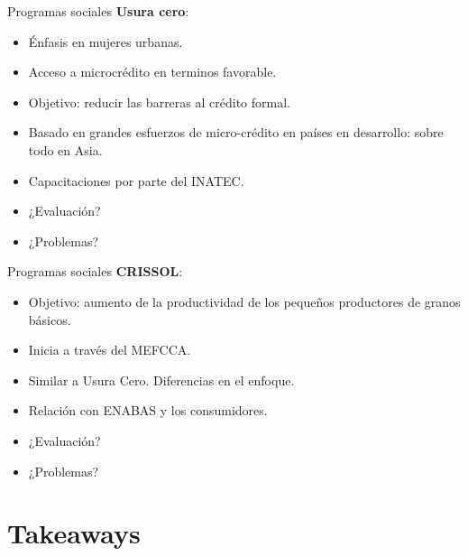 \documentclass[11pt, aspectratio=169, compress]{beamer}
\begin{document}
\begin{frame}[t]{Programas sociales}
\textbf{Usura cero}:
\begin{itemize}
	\item Énfasis en mujeres urbanas. 
	\item Acceso a microcrédito en terminos favorable. 
	\item Objetivo: reducir las barreras al crédito formal. 
	\item Basado en grandes esfuerzos de micro-crédito en países en desarrollo: sobre todo en Asia. 
	\item Capacitaciones por parte del INATEC. 
	\item ¿Evaluación? 
	\item ¿Problemas? 
\end{itemize}
\end{frame}
\begin{frame}[t]{Programas sociales}
\textbf{CRISSOL}:
\begin{itemize}
	\item Objetivo: aumento de la productividad de los pequeños productores de granos básicos. 
	\item Inicia a través del MEFCCA. 
	\item Similar a Usura Cero. Diferencias en el enfoque. 
	\item Relación con ENABAS y los consumidores.
	\item ¿Evaluación?
	\item ¿Problemas? 
\end{itemize}
\end{frame}
\section{Takeaways}
\end{document}
